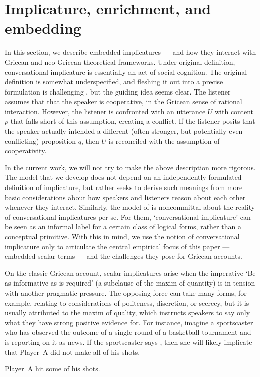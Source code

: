 \documentclass[leqno,12pt]{article}
\begin{document}
\section{Implicature, enrichment, and embedding}\label{sec:implicature}

In this section, we describe embedded implicatures --- and how they
interact with Gricean and neo-Gricean theoretical frameworks. Under
 original definition, conversational implicature is
essentially  an act of social cognition. The original
definition is somewhat underspecified, and fleshing it out into a
precise formulation is challenging \citep{Hirschberg85}, but the
guiding idea seems clear.  The listener assumes that that the speaker
is cooperative, in the Gricean sense of rational interaction. However,
the listener is confronted with an utterance $U$ with content $p$ that
falls short of this assumption, creating a conflict. If the listener
posits that the speaker actually intended a different (often stronger,
but potentially even conflicting) proposition $q$, then $U$ is
reconciled with the assumption of cooperativity.

In the current work, we will not try to make the above description more
rigorous. The model that we develop does not depend on an independently
formulated definition of implicature, but rather seeks to derive such
meanings from more basic considerations about how speakers and
listeners reason about each other whenever they interact. Similarly, the model of
\citet{ChierchiaFoxSpector08} is noncommittal about the
reality of conversational implicatures per se. For them,
`conversational implicature' can be seen as an informal label for a
certain class of logical forms, rather than a conceptual
primitive. With this in mind, we use the notion of conversational
implicature only to articulate the central empirical focus of this
paper --- embedded scalar terms --- and the
challenges they pose for Gricean accounts.

On the classic Gricean account, scalar implicatures arise when the imperative `Be as informative as is
required' (a subclause of the maxim of quantity) is in tension with
another pragmatic pressure. The opposing force can take many forms,
for example, relating to considerations of politeness, discretion, or
secrecy, but it is usually attributed to the maxim of quality, which
instructs speakers to say only what they have strong positive evidence
for. For instance, imagine a sportscaster who has observed the outcome
of a single round of a basketball tournament and is reporting on it as
news. If the sportscaster says , then she will likely
implicate that Player~A did not make all of his shots.
%
\begin{examples}
\item\label{some} Player~A hit some of his shots.
\end{examples}
\end{document}
